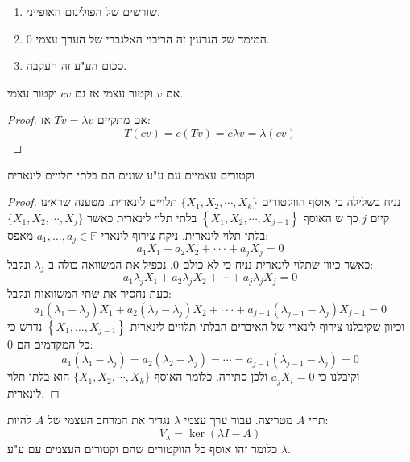 \documentclass{tstextbook}
\begin{document}
\begin{proposition}
  \begin{enumerate}
    \item שורשים של הפולינום האופייני. 


    \item המימד של הגרעין זה הריבוי האלגברי של הערך עצמי 0. 


    \item סכום הע"ע זה העקבה. 


  \end{enumerate}
\end{proposition}
\begin{proposition}
אם \(v\) וקטור עצמי אז גם \(cv\) וקטור עצמי.

\end{proposition}
\begin{proof}
אם מתקיים \(Tv=\lambda v\) אז:
$$T(cv)=c(Tv)=c\lambda v=\lambda(cv)$$

\end{proof}
\begin{proposition}
וקטורים עצמיים עם ע"ע שונים הם בלתי תלויים לינארית

\end{proposition}
\begin{proof}
נניח בשלילה כי אוסף הווקטורים \(\{X_{1},X_{2},\cdots,X_{k}\}\) תלויים לינארית. מטענה שראינו קיים \(j\) כך ש האוסף \(\left\{X_{1},X_{2},\cdots,X_{j-1}\right\}\)
בלתי תלוי לינארית כאשר \(\{X_{1},X_{2},\cdots,X_{j}\}\) בלתי תלוי לינארית. ניקח צירוף לינארי \(a_{1},\dots,a_{j}\in \mathbb{F}\) מאפס:
$$a_{1}X_{1}+a_{2}X_{2}+\cdot\cdot\cdot+a_{j}X_{j}=0$$
כאשר כיוון שתלוי לינארית נניח כי לא כולם 0. נכפיל את המשוואה כולה ב-\(\lambda_{j}\) ונקבל:
$$a_{1}\lambda_{j}X_{1}+a_{2}\lambda_{j}X_{2}+\cdots+a_{j}\lambda_{j}X_{j}=0$$
כעת נחסיר את שתי המשוואות ונקבל:
$$a_{1}(\lambda_{1}-\lambda_{j})X_{1}+a_{2}(\lambda_{2}-\lambda_{j})X_{2}+\cdot\cdot\cdot+a_{j-1}(\lambda_{j-1}-\lambda_{j})X_{j-1}=0$$
וכיוון שקיבלנו צירוף לינארי של האיברים הבלתי תלויים לינארית \(\left\{  X_{1},\dots, X_{j-1}  \right\}\) נדרש כי כל המקדמים הם 0:
$$a_{1}(\lambda_{1}-\lambda_{j})=a_{2}(\lambda_{2}-\lambda_{j})=\cdots=a_{j-1}(\lambda_{j-1}-\lambda_{j})=0$$
וקיבלנו כי \(a_{j}X_{i}=0\) ולכן סתירה. כלומר האוסף \(\{X_{1},X_{2},\cdots,X_{k}\}\) הוא בלתי תלוי לינארית.

\end{proof}
\begin{definition}
תהי \(A\) מטריצה. עבור ערך עצמי \(\lambda\) נגדיר את המרחב העצמי של \(A\) להיות:
$$V_{\lambda}=\ker(\lambda I-A)$$
כלומר זהו אוסף כל הווקטורים שהם וקטורים העצמים עם ע"ע \(\lambda\).

\end{definition}
\end{document}
